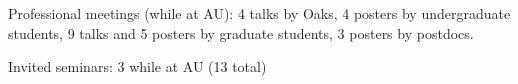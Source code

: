 \begin{veryTightItemize}
    \item Professional meetings (while at AU): 4 talks by Oaks,
        4 posters by undergraduate students,
        9 talks and 5 posters by graduate students,
        3 posters by postdocs.
    \item Invited seminars: 3 while at AU (13 total)
\end{veryTightItemize}

